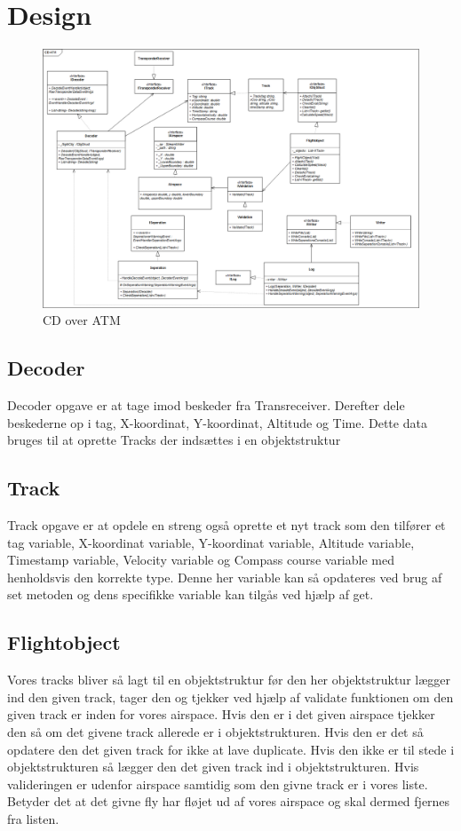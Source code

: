 \section{Design}
\begin{figure}[H]
	\centering
	\includegraphics[width=1\linewidth]{../Diagrammer/CD_ATM_Fuld}
	\caption{CD over ATM}
	\label{fig:cdatm}
\end{figure}

\subsection{Decoder}
Decoder opgave er at tage imod beskeder fra Transreceiver. Derefter dele beskederne op i tag, X-koordinat, Y-koordinat, Altitude og Time. Dette data bruges til at oprette Tracks der indsættes i en objektstruktur
\subsection{Track}
Track opgave er at opdele en streng også oprette et nyt track som den tilfører et tag variable, X-koordinat variable, Y-koordinat variable, Altitude variable, Timestamp variable, Velocity variable og Compass course variable med henholdsvis den korrekte type. Denne her variable kan så opdateres ved brug af set metoden og dens specifikke variable kan tilgås ved hjælp af get.
\subsection{Flightobject}
Vores tracks bliver så lagt til en objektstruktur før den her objektstruktur lægger ind den given track, tager den og tjekker ved hjælp af validate funktionen om den given track er inden for vores airspace. Hvis den er i det given airspace tjekker den så om det givene track allerede er i objektstrukturen. Hvis den er det så opdatere den det given track for ikke at lave duplicate. Hvis den ikke er til stede i objektstrukturen så lægger den det given track ind i objektstrukturen. Hvis valideringen er udenfor airspace samtidig som den givne track er i vores liste. Betyder det at det givne fly har fløjet ud af vores airspace og skal dermed fjernes fra listen.
